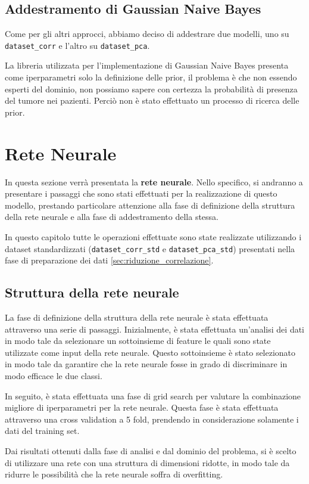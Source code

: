 \subsection{Addestramento di Gaussian Naive Bayes}
Come per gli altri approcci, abbiamo deciso di addestrare due modelli, uno su
\texttt{dataset\_corr} e l'altro su \texttt{dataset\_pca}.

La libreria utilizzata per l'implementazione di Gaussian Naive Bayes
presenta come iperparametri solo la definizione delle prior, il problema è che non
essendo esperti del dominio, non possiamo sapere con certezza la probabilità 
di presenza del tumore nei pazienti. Perciò non è stato effettuato un processo di 
ricerca delle prior.

\section{Rete Neurale}
In questa sezione verrà presentata la \textbf{rete neurale}. Nello specifico, si
andranno a presentare i passaggi che sono stati effettuati per la realizzazione
di questo modello, prestando particolare attenzione alla fase di definizione
della struttura della rete neurale e alla fase di addestramento della stessa.

In questo capitolo tutte le operazioni effettuate sono state realizzate
utilizzando i dataset standardizzati (\texttt{dataset\_corr\_std} e
\texttt{dataset\_pca\_std}) presentati nella fase di preparazione dei
dati \ref{sec:riduzione_correlazione}.
\subsection{Struttura della rete neurale}
La fase di definizione della struttura della rete neurale è stata effettuata
attraverso una serie di passaggi. Inizialmente, è stata effettuata un'analisi
dei dati in modo tale da selezionare un sottoinsieme di feature le quali sono
state utilizzate come input della rete neurale. Questo sottoinsieme è stato
selezionato in modo tale da garantire che la rete neurale fosse in grado di
discriminare in modo efficace le due classi.

In seguito, è stata effettuata una fase di grid search per valutare la combinazione
migliore di iperparametri per la rete neurale. Questa fase è stata effettuata
attraverso una cross validation a 5 fold, prendendo in considerazione solamente
i dati del training set.

Dai risultati ottenuti dalla fase di analisi e dal dominio del problema, si è
scelto di utilizzare una rete con una struttura di dimensioni ridotte, in modo
tale da ridurre le possibilità che la rete neurale soffra di overfitting.

